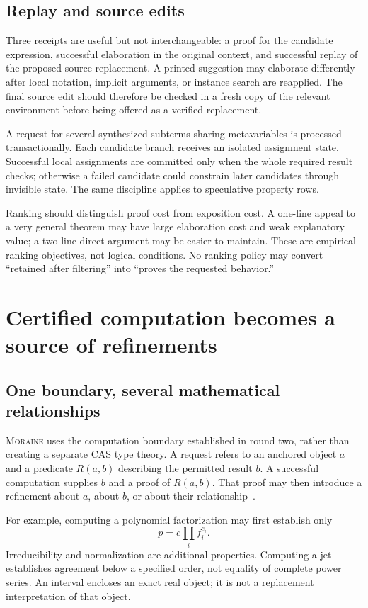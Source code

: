 \documentclass[11pt,letterpaper]{article}
\newcommand{\moraine}{\textsc{Moraine}}
\theoremstyle{definition}
\theoremstyle{remark}
\begin{document}
\subsection{Replay and source edits}
Three receipts are useful but not interchangeable: a proof for the candidate
expression, successful elaboration in the original context, and successful
replay of the proposed source replacement. A printed suggestion may elaborate
differently after local notation, implicit arguments, or instance search are
reapplied. The final source edit should therefore be checked in a fresh copy of
the relevant environment before being offered as a verified replacement.

A request for several synthesized subterms sharing metavariables is processed
transactionally. Each candidate branch receives an isolated assignment state.
Successful local assignments are committed only when the whole required result
checks; otherwise a failed candidate could constrain later candidates through
invisible state. The same discipline applies to speculative property rows.

Ranking should distinguish proof cost from exposition cost. A one-line appeal to
a very general theorem may have large elaboration cost and weak explanatory
value; a two-line direct argument may be easier to maintain. These are empirical
ranking objectives, not logical conditions. No ranking policy may convert
``retained after filtering'' into ``proves the requested behavior.''

\section{Certified computation becomes a source of refinements}\label{sec:cas}

\subsection{One boundary, several mathematical relationships}
\moraine{} uses the computation boundary established in round two, rather than
creating a separate CAS type theory. A request refers to an anchored object $a$
and a predicate $R(a,b)$ describing the permitted result $b$. A successful
computation supplies $b$ and a proof of $R(a,b)$. That proof may then introduce a
refinement about $a$, about $b$, or about their relationship~\cite{B1,B2}.

For example, computing a polynomial factorization may first establish only
\[
p=c\prod_i f_i^{e_i}.
\]
Irreducibility and normalization are additional properties. Computing a jet
establishes agreement below a specified order, not equality of complete power
series. An interval encloses an exact real object; it is not a replacement
interpretation of that object.
\end{document}
